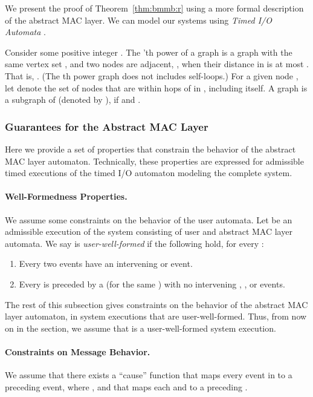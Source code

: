 




We present the 
proof of  Theorem~\ref{thm:bmmb:r} using a more formal description of the abstract MAC layer.
We can model our systems using \emph{Timed I/O Automata} \cite{TIOA2010}.

Consider some positive integer .
The 'th power  of a graph  is a graph with the same vertex set , and two nodes 
are adjacent, , when their distance in  is at most .
That is,
.
(The th power  graph  does not includes self-loops.)
For a given node ,
let  denote the set of nodes that are within  hops of 
in , including  itself.
A graph  is a subgraph of  (denoted by ), if  and .








\subsubsection{Guarantees for the Abstract MAC Layer}
\label{sec:model:prop}

Here we provide a set of properties that constrain the
behavior of the abstract MAC layer automaton.
Technically, these properties are expressed for admissible timed
executions of the timed I/O automaton modeling the complete system.

\paragraph{Well-Formedness Properties.}
We assume some constraints on the behavior of the user automata.
Let  be an admissible execution of the system consisting of
user and abstract MAC layer automata.
We say  is {\em user-well-formed} if the following hold, for
every :
\begin{enumerate}
\item
Every two  events have an intervening  or  event.
\item
Every  is preceded by a  (for the same )
with no intervening , , or  events.
\end{enumerate}

The rest of this subsection gives constraints on the behavior of the
abstract MAC layer automaton, in system executions that are
user-well-formed.
Thus, from now on in the section, we assume that  is a
user-well-formed system execution.

\paragraph{Constraints on Message Behavior.}
We assume that there exists a ``cause'' function that maps every 
event in  to a preceding  event, where ,
and that maps each  and  to a preceding .

